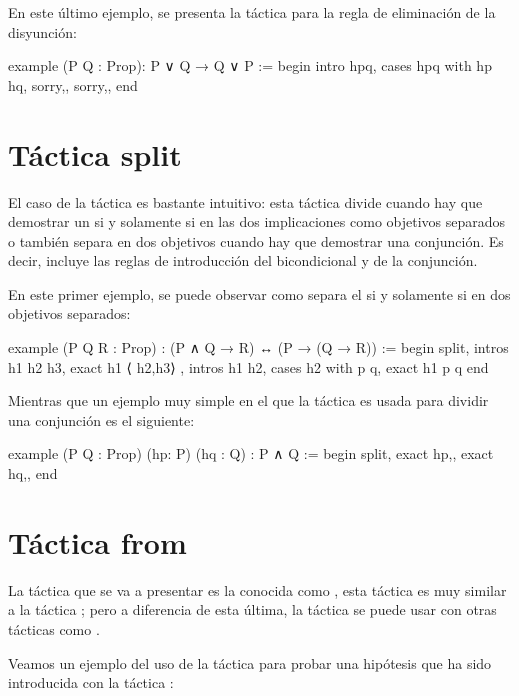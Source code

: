 En este último ejemplo, se presenta la táctica  para la
regla de eliminación de la disyunción:

\begin{leancode}
example (P Q : Prop): P ∨ Q → Q ∨ P :=
begin
  intro hpq,
  cases hpq with hp hq,
  {sorry,},
  {sorry,},
end
\end{leancode}

\section{Táctica split}

El caso de la táctica  es bastante intuitivo: esta táctica
divide cuando hay que demostrar un si y solamente si en las dos implicaciones
como objetivos separados o también separa en dos objetivos cuando hay que
demostrar una conjunción. Es decir, incluye las reglas de introducción
del bicondicional y de la conjunción.

En este primer ejemplo, se puede observar como separa el si y solamente si en
dos objetivos separados:

\begin{leancode}
example (P Q R : Prop) : (P ∧ Q → R) ↔ (P → (Q → R)) :=
begin
  split,
  { intros h1 h2 h3,
    exact h1 ⟨ h2,h3⟩ },
  { intros h1 h2,
    cases h2 with p q,
    exact h1 p q}
end
\end{leancode}

Mientras que un ejemplo muy simple en el que la táctica 
es usada para dividir una conjunción es el siguiente:
\begin{leancode}
example (P Q : Prop) (hp: P) (hq : Q) : P ∧ Q :=
begin
  split,
  { exact hp,},
  { exact hq,},
end
\end{leancode}

\section{Táctica from}

La táctica que se va a presentar es la conocida como , esta
táctica es muy similar a la táctica ; pero a diferencia
de esta última, la táctica  se puede usar con otras tácticas
como .

Veamos un ejemplo del uso de la táctica  para probar una
hipótesis que ha sido introducida con la táctica :

